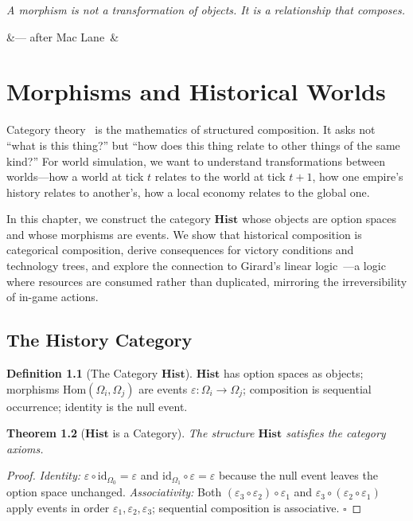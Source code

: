 \documentclass[11pt,a4paper,openany]{book}
\theoremstyle{plain}
\newtheorem{theorem}{Theorem}[chapter]
\theoremstyle{definition}
\newtheorem{definition}[theorem]{Definition}
\theoremstyle{remark}
\newenvironment{background}{%
  \begin{mdframed}[
    linecolor=sphereblue!40, backgroundcolor=sphereblue!5,
    linewidth=1pt, innertopmargin=8pt, innerbottommargin=8pt,
    innerleftmargin=10pt, innerrightmargin=10pt,
    skipabove=10pt, skipbelow=6pt
  ]%
  \setlength{\parindent}{0pt}%
  \noindent{\textcolor{sphereblue}{\textbf{Background}}}\par\smallskip\ignorespaces
}{\end{mdframed}}
\newcommand{\chapterquote}[2]{%
  \par\vspace{0.8em}%
  \begin{flushright}%
    \begin{minipage}{0.65\textwidth}%
      {\itshape #1\par}%
      \ifx&#2&\else\vspace{0.3em}{\raggedleft\small--- #2\par}\fi%
    \end{minipage}%
  \end{flushright}%
  \vspace{0.8em}\par\noindent}
\begin{document}
\chapterquote{A morphism is not a transformation of objects.
  It is a relationship that composes.
}{--- after Mac Lane~\cite{MacLane}}

\chapter{Morphisms and Historical Worlds}
\label{ch:morphisms}

\begin{background}
  Category theory~\cite{MacLane} is the mathematics of structured
  composition. It asks not ``what is this thing?'' but ``how does this
  thing relate to other things of the same kind?'' For world simulation,
  we want to understand transformations between worlds---how a world at
  tick $t$ relates to the world at tick $t+1$, how one empire's history
  relates to another's, how a local economy relates to the global one.

  In this chapter, we construct the category $\mathbf{Hist}$ whose
  objects are option spaces and whose morphisms are events. We show that
  historical composition is categorical composition, derive consequences
  for victory conditions and technology trees, and explore the connection
  to Girard's linear logic~\cite{Girard}---a logic where resources are
  consumed rather than duplicated, mirroring the irreversibility of
  in-game actions.
\end{background}

\section{The History Category}

\begin{definition}[The Category $\mathbf{Hist}$]
  $\mathbf{Hist}$ has option spaces as objects; morphisms
  $\mathrm{Hom}(\Omega_i, \Omega_j)$ are events
  $\varepsilon : \Omega_i \to \Omega_j$; composition is sequential
  occurrence; identity is the null event.
\end{definition}

\begin{theorem}[$\mathbf{Hist}$ is a Category]
  The structure $\mathbf{Hist}$ satisfies the category axioms.
\end{theorem}
\begin{proof}
  \textit{Identity:} $\varepsilon \circ \mathrm{id}_{\Omega_0} = \varepsilon$
  and $\mathrm{id}_{\Omega_1} \circ \varepsilon = \varepsilon$ because
  the null event leaves the option space unchanged.
  \textit{Associativity:} Both $(\varepsilon_3 \circ \varepsilon_2)
  \circ \varepsilon_1$ and $\varepsilon_3 \circ (\varepsilon_2 \circ
  \varepsilon_1)$ apply events in order $\varepsilon_1, \varepsilon_2,
  \varepsilon_3$; sequential composition is associative. $\square$
\end{proof}
\end{document}
